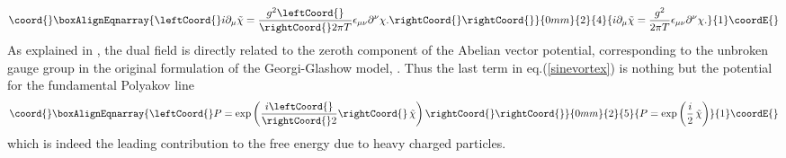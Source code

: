 \documentclass[a4paper,aps,prd,superscriptaddress,showpacs,showkeys]{revtex4}
\begin{document}
\begin{eqnarray}\coord{}\boxAlignEqnarray{\leftCoord{}
i\partial_{\mu}\tilde\chi= {g^2\leftCoord{}\over\rightCoord{} 2\pi T}
\epsilon_{\mu\nu}\partial^\nu \chi.\rightCoord{}
\label{chid}
\rightCoord{}}{0mm}{2}{4}{
i\partial_{\mu}\tilde\chi= {g^2\over 2\pi T}
\epsilon_{\mu\nu}\partial^\nu \chi.
}{1}\coordE{}\end{eqnarray}
As explained in \cite{gg1}, the dual field \myHighlight{$\tilde \chi$}\coordHE{} is directly
related to the zeroth component of the Abelian vector potential,
corresponding to the unbroken \coordHE{} gauge group in the original
formulation of the
Georgi-Glashow model, \coordHE{}.
Thus the last term in eq.(\ref{sinevortex}) is nothing but the
potential \coordHE{} for the fundamental Polyakov line
\begin{eqnarray}\coord{}\boxAlignEqnarray{\leftCoord{}
P=\exp\left({i\leftCoord{}\over\rightCoord{} 2}\rightCoord{}\,\tilde\chi\right) \rightCoord{}
\label{polyakovline}
\rightCoord{}}{0mm}{2}{5}{
P=\exp\left({i\over 2}\,\tilde\chi\right) 
}{1}\coordE{}\end{eqnarray}
which is indeed the leading contribution to the free energy due to heavy
charged particles.
\end{document}
